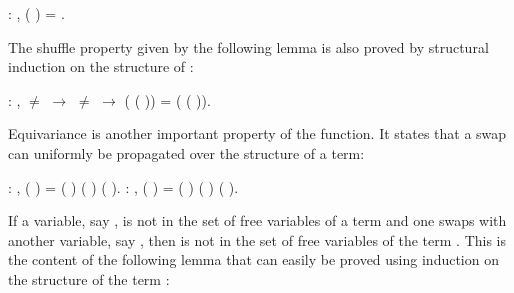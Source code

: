 \begin{coqdoccode}
\coqdocemptyline
\coqdocnoindent
{}  : \coqdockw{\ensuremath{\forall}}   ,    (   ) = .\coqdoceol
\coqdocemptyline
\end{coqdoccode}
The shuffle property given by the following lemma is also proved by structural induction on the structure of :
\begin{coqdoccode}
\coqdocemptyline
\coqdocnoindent
{}  : \coqdockw{\ensuremath{\forall}}    ,  \ensuremath{\not=}  \ensuremath{\rightarrow}  \ensuremath{\not=}  \ensuremath{\rightarrow} (   (   )) = (   (   )).\coqdoceol
\coqdocemptyline
\coqdocemptyline
\end{coqdoccode}
Equivariance is another important property of the  function. It states that a swap can uniformly be propagated over the structure of a term:
\begin{coqdoccode}
\coqdocemptyline
\coqdocnoindent
{}  : \coqdockw{\ensuremath{\forall}}     ,    (   ) =  (   ) (   ) (   ).\coqdoceol
\coqdocemptyline
\coqdocnoindent
{}  : \coqdockw{\ensuremath{\forall}}     ,    (   ) =  (   ) (   ) (   ).\coqdoceol
\coqdocemptyline
\end{coqdoccode}
If a variable, say , is not in the set of free variables of a term  and one swaps  with another variable, say , then  is not in the set of free variables of the term . This is the content of the following lemma that can easily be proved using induction on the structure of the term :
